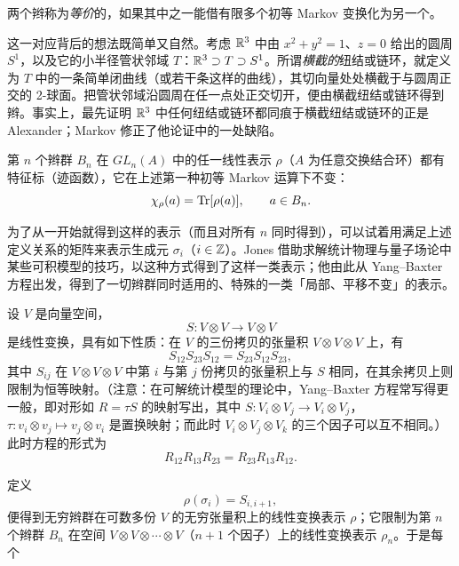 两个辫称为\emph{等价}的，如果其中之一能借有限多个初等 Markov 变换化为另一个。



这一对应背后的想法既简单又自然。考虑 $\mathbb{R}^3$ 中由 $x^2+y^2=1$、$z=0$ 给出的圆周 $S^1$，以及它的小半径管状邻域 $T$：$\mathbb{R}^3\supset T\supset S^1$。所谓\emph{横截的}纽结或链环，就定义为 $T$ 中的一条简单闭曲线（或若干条这样的曲线），其切向量处处横截于与圆周正交的 2-球面。把管状邻域沿圆周在任一点处正交切开，便由横截纽结或链环得到辫。事实上，最先证明 $\mathbb{R}^3$ 中任何纽结或链环都同痕于横截纽结或链环的正是 Alexander；Markov 修正了他论证中的一处缺陷。

第 $n$ 个辫群 $B_n$ 在 $GL_n(A)$ 中的任一线性表示 $\rho$（$A$ 为任意交换结合环）都有特征标（迹函数），它在上述第一种初等 Markov 运算下不变：
\[
\chi_\rho(a)=\operatorname{Tr}[\rho(a)],\qquad a\in B_n.
\]

为了从一开始就得到这样的表示（而且对所有 $n$ 同时得到），可以试着用满足上述定义关系的矩阵来表示生成元 $\sigma_i$（$i\in\mathbb{Z}$）。Jones 借助求解统计物理与量子场论中某些可积模型的技巧，以这种方式得到了这样一类表示；他由此从 Yang--Baxter 方程出发，得到了一切辫群同时适用的、特殊的一类「局部、平移不变」的表示。

设 $V$ 是向量空间，
\[
S:V\otimes V\to V\otimes V
\]
是线性变换，具有如下性质：在 $V$ 的三份拷贝的张量积 $V\otimes V\otimes V$ 上，有
\[
S_{12}S_{23}S_{12}=S_{23}S_{12}S_{23},
\]
其中 $S_{ij}$ 在 $V\otimes V\otimes V$ 中第 $i$ 与第 $j$ 份拷贝的张量积上与 $S$ 相同，在其余拷贝上则限制为恒等映射。（注意：在可解统计模型的理论中，Yang--Baxter 方程常写得更一般，即对形如 $R=\tau S$ 的映射写出，其中 $S:V_i\otimes V_j\to V_i\otimes V_j$，$\tau:v_i\otimes v_j\mapsto v_j\otimes v_i$ 是置换映射；而此时 $V_i\otimes V_j\otimes V_k$ 的三个因子可以互不相同。）此时方程的形式为
\[
R_{12}R_{13}R_{23}=R_{23}R_{13}R_{12}.
\]

定义
\[
\rho(\sigma_i)=S_{i,i+1},
\]
便得到无穷辫群在可数多份 $V$ 的无穷张量积上的线性变换表示 $\rho$；它限制为第 $n$ 个辫群 $B_n$ 在空间 $V\otimes V\otimes\cdots\otimes V$（$n+1$ 个因子）上的线性变换表示 $\rho_n$。于是每个


